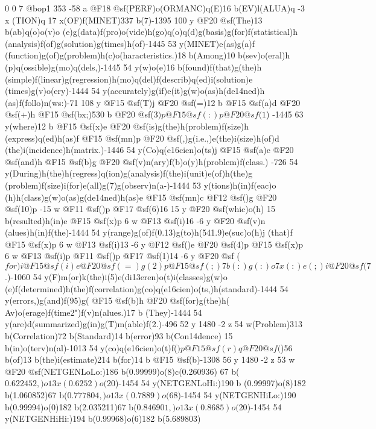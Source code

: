 {{{{{{{{{{{{{{{{{{{{{{{{{{{{{{{{{{{{{{{{{{{0 0 7 @bop1 353 -58 a @F18 @sf(PERF)o(ORMANC)q(E)16 b(EV)l(ALUA)q -3 x
(TION)q 17 x(OF)f(MINET)337 b(7)-1395 100 y @F20 @sf(The)13 b(ab)q(o)o(v)o
(e)g(data)f(pro)o(vide)h(go)q(o)q(d)g(basis)g(for)f(statistical)h
(analysis)f(of)g(solution)g(times)h(of)-1445 53 y(MINET)e(as)g(a)f
(function)g(of)g(problem)h(c)o(haracteristics.)18 b(Among)10 b(sev)o(eral)h
(p)q(ossible)g(mo)q(dels,)-1445 54 y(w)o(e)16 b(found)f(that)g(the)h
(simple)f(linear)g(regression)h(mo)q(del)f(describ)q(ed)i(solution)e
(times)g(v)o(ery)-1444 54 y(accurately)g(if)e(it)g(w)o(as)h(de\014ned)h
(as)f(follo)n(ws:)-71 108 y @F15 @sf(T)j @F20 @sf(=)12 b @F15 @sf(a)d 
@F20 @sf(+)h @F15 @sf(bx;)530 b @F20 @sf(\(3)p @F15 @sf(:)p @F20 @sf(1\))
-1445 63 y(where)12 b @F15 @sf(x)e @F20 @sf(is)g(the)h(problem)f(size)h
(express)q(ed)h(as)f @F15 @sf(mn)p @F20 @sf(,)g(i.e.,)e(the)i(size)h(of)d
(the)i(incidence)h(matrix.)-1446 54 y(Co)q(e\016cien)o(ts)j @F15 @sf(a)e 
@F20 @sf(and)h @F15 @sf(b)g @F20 @sf(v)n(ary)f(b)o(y)h(problem)f(class.)
-726 54 y(During)h(the)h(regress)q(ion)g(analysis)f(the)i(unit)e(of)h(the)g
(problem)f(size)i(for)e(all)g(7)g(observ)n(a-)-1444 53 y(tions)h(in)f(eac)o
(h)h(class)g(w)o(as)g(de\014ned)h(as)e @F15 @sf(mn)c @F12 @sf()g 
@F20 @sf(10)p -15 w @F11 @sf()p @F17 @sf(6)16 15 y @F20 @sf(whic)o(h)
15 b(resulted)h(in)e @F15 @sf(x)p 6 w @F13 @sf(i)16 -6 y @F20 @sf(v)n
(alues)h(in)f(the)-1444 54 y(range)g(of)f(0.13)g(to)h(541.9)e(suc)o(h)j
(that)f @F15 @sf(x)p 6 w @F13 @sf(i)13 -6 y @F12 @sf()e @F20 @sf(4)p 
@F15 @sf(x)p 6 w @F13 @sf(i)p @F11 @sf()p @F17 @sf(1)14 -6 y @F20 @sf
(\(for)i @F15 @sf(i)e @F20 @sf(=)g(2)p @F15 @sf(;)7 b(:)g(:)o 7 x(:)e(;)i 
@F20 @sf(7\).)-1060 54 y(F)m(or)k(the)i(5)e(di\013eren)o(t)i(classes)g(w)o
(e)f(determined)h(the)f(correlation)g(co)q(e\016cien)o(ts,)h(standard)-1444 
54 y(errors,)g(and)f(95)g(%
@F15 @sf(b)h @F20 @sf(for)g(the)h(\\Av)o(erage)f(time{2")f(v)n(alues.)17 b
(They)-1444 54 y(are)d(summarized)g(in)g(T)m(able)f(2.)-496 52 y 1480 -2 z 
54 w(Problem)313 b(Correlation)72 b(Standard)14 b(error)93 b(Con\014dence)
15 b(in)o(terv)n(al)-1013 54 y(co)q(e\016cien)o(t)f(\()p @F15 @sf(r)q 
@F20 @sf(\))56 b(of)13 b(the)i(estimate)214 b(for)14 b @F15 @sf(b)-1308 
56 y 1480 -2 z 53 w @F20 @sf(NETGEN{Lo{Lo:)186 b(0.99999)o(8)c(0.260936)
67 b(\(0.622452,)o 13 x(0.6252)o(20\))-1454 54 y(NETGEN{Lo{Hi:)190 b
(0.99997)o(8)182 b(1.060852)67 b(\(0.777804,)o 13 x(0.7889)o(68\))-1454 
54 y(NETGEN{Hi{Lo:)190 b(0.99994)o(0)182 b(2.035211)67 b(\(0.846901,)o 13 x
(0.8685)o(20\))-1454 54 y(NETGEN{Hi{Hi:)194 b(0.99968)o(6)182 b(5.689803)
}}}}}}}}}}}}}}}}}}}}}}}}}}}}}}}}}}}}}}}}}}}}}}}}}}}}
